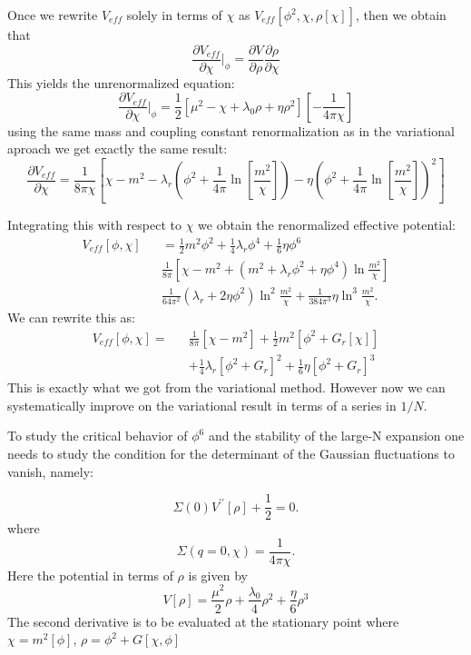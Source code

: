 \documentclass[a4paper,prd,preprint,superscriptaddress,showpacs,byrevtex]{revtex4}
\begin{document}
 Once we rewrite $V_{eff}$ solely in terms of $\chi$ as
$V_{eff}\left[\phi^2, \chi,\rho[\chi]\right]$,
then we obtain that
\begin{equation}
\frac{\partial V_{eff}} {\partial \chi}|_{\phi} = \frac{\partial V} {\partial
\rho} \frac{\partial \rho} {\partial \chi}
\end{equation}
This yields the unrenormalized equation:
\begin{equation}
\frac{\partial V_{eff}} {\partial \chi}|_{\phi}= \frac{1}{2} [\mu^2 -
\chi+\lambda_0 \rho + \eta \rho^2][- \frac{1} {4 \pi
\chi}]
\end{equation}
using the same mass and coupling constant renormalization as in the
variational aproach we get exactly
the same result:
\begin{equation}
\frac{\partial V_{eff}} {\partial \chi}= \frac{1} {8 \pi \chi} \left[\chi -
m^2 - \lambda_r\left(\phi^2
+\frac{1}{4 \pi} {\ln} [\frac{m^2}{\chi}] \right)- \eta \left( \phi^2
+\frac{1}{4 \pi}
{\ln} [\frac{m^2}{\chi}] \right)^2  \right]
\end{equation}

Integrating this with respect to $\chi$ we obtain the renormalized effective
potential:
\begin{eqnarray}
V_{eff}[\phi,\chi] && = \frac{1}{2} m^2 \phi^2 + \frac{1}{4} \lambda_r \phi^4
+\frac{1}{6} \eta \phi^6
\nonumber \\
&& \frac{1}{8 \pi} [ \chi - m^2 + (m^2+ \lambda_r \phi^2+\eta \phi^4) \ln
\frac{m^2}{\chi} ] \nonumber
\\
&&\frac{1}{64 \pi^2} (\lambda_r  + 2 \eta \phi^2) \ln^2 \frac{m^2}{\chi}
+\frac{1}{384 \pi^3} \eta \ln^3
\frac{m^2}{\chi}.
\end{eqnarray}
We can rewrite this as:
\begin{eqnarray}
V_{eff}[\phi,\chi]=&&\frac{1}{8 \pi} [ \chi - m^2]  + \frac{1}{2} m^2 [\phi^2
+G_r[\chi]]
\nonumber \\
&& + \frac{1}{4} \lambda_r [\phi^2+G_r]^2 + \frac{1}{6} \eta[\phi^2 + G_r]^3
\end{eqnarray}
This is exactly what we got from the variational method. However now we can
systematically improve on the variational result in terms of a series in
$1/N$.

To study the critical behavior of $\phi^6$ and the stability of the large-N expansion
one needs to study the condition for the determinant of the Gaussian fluctuations to
vanish, namely:

\begin{equation}
\Sigma(0) V^{\prime \prime} [\rho] + \frac{1}{2} = 0.
\end{equation}
where
\begin{equation}
\Sigma(q=0,\chi) = \frac{1}{4 \pi \chi}.
\end{equation}
Here the potential in terms of $\rho$ is given by
\begin{equation}
V[\rho] = \frac {\mu^2}{2} \rho + \frac{\lambda_0} {4} \rho^2 + \frac{\eta}{6} \rho^3
\end{equation}
The second derivative is to be evaluated at the stationary point where
$\chi=m^2[\phi]$, $\rho = \phi^2+ G[\chi,\phi]$
\end{document}
